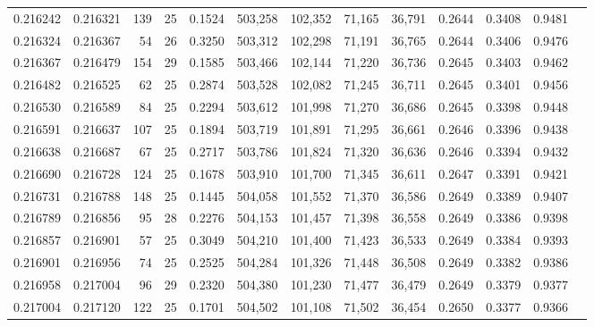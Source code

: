 \begin{tabular}{rrrrrrrrrrrrr}
0.216242 & 0.216321 & 139 &  25 &                                     0.1524 & 503,258 & 102,352 &  71,165 &  36,791 & 0.2644 & 0.3408 & 0.9481 \\
0.216324 & 0.216367 &  54 &  26 &                                     0.3250 & 503,312 & 102,298 &  71,191 &  36,765 & 0.2644 & 0.3406 & 0.9476 \\
0.216367 & 0.216479 & 154 &  29 &                                     0.1585 & 503,466 & 102,144 &  71,220 &  36,736 & 0.2645 & 0.3403 & 0.9462 \\
0.216482 & 0.216525 &  62 &  25 &                                     0.2874 & 503,528 & 102,082 &  71,245 &  36,711 & 0.2645 & 0.3401 & 0.9456 \\
0.216530 & 0.216589 &  84 &  25 &                                     0.2294 & 503,612 & 101,998 &  71,270 &  36,686 & 0.2645 & 0.3398 & 0.9448 \\
0.216591 & 0.216637 & 107 &  25 &                                     0.1894 & 503,719 & 101,891 &  71,295 &  36,661 & 0.2646 & 0.3396 & 0.9438 \\
0.216638 & 0.216687 &  67 &  25 &                                     0.2717 & 503,786 & 101,824 &  71,320 &  36,636 & 0.2646 & 0.3394 & 0.9432 \\
0.216690 & 0.216728 & 124 &  25 &                                     0.1678 & 503,910 & 101,700 &  71,345 &  36,611 & 0.2647 & 0.3391 & 0.9421 \\
0.216731 & 0.216788 & 148 &  25 &                                     0.1445 & 504,058 & 101,552 &  71,370 &  36,586 & 0.2649 & 0.3389 & 0.9407 \\
0.216789 & 0.216856 &  95 &  28 &                                     0.2276 & 504,153 & 101,457 &  71,398 &  36,558 & 0.2649 & 0.3386 & 0.9398 \\
0.216857 & 0.216901 &  57 &  25 &                                     0.3049 & 504,210 & 101,400 &  71,423 &  36,533 & 0.2649 & 0.3384 & 0.9393 \\
0.216901 & 0.216956 &  74 &  25 &                                     0.2525 & 504,284 & 101,326 &  71,448 &  36,508 & 0.2649 & 0.3382 & 0.9386 \\
0.216958 & 0.217004 &  96 &  29 &                                     0.2320 & 504,380 & 101,230 &  71,477 &  36,479 & 0.2649 & 0.3379 & 0.9377 \\
0.217004 & 0.217120 & 122 &  25 &                                     0.1701 & 504,502 & 101,108 &  71,502 &  36,454 & 0.2650 & 0.3377 & 0.9366 \\

\end{tabular}
